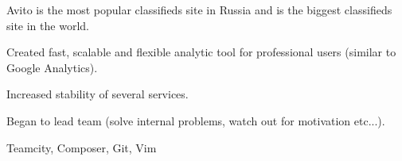   Avito is the most popular classifieds site in Russia and is the biggest
  classifieds site in the world.
  \begin{gaas}
    \item Created fast, scalable and flexible analytic tool for professional
      users (similar to Google Analytics).
    \item Increased stability of several services.
    \item Began to lead team (solve internal problems, watch out for
      motivation etc...).
  \end{gaas}
  \devtools
    Teamcity, Composer, Git, Vim

